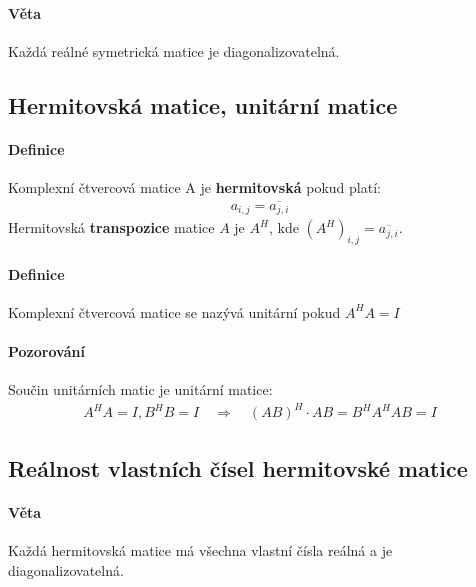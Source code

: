 \documentclass[a4paper,10pt]{article}
\begin{document}
\paragraph{Věta}
Každá reálné symetrická matice je diagonalizovatelná.

\subsection{Hermitovská matice, unitární matice}
\setcounter{equation}{0}
\paragraph{Definice}
Komplexní čtvercová matice A je \textbf{hermitovská} pokud platí:
\begin{align*}
	a_{i,j} = \overline{a_{j,i}}
\end{align*}
Hermitovská \textbf{transpozice} matice $A$ je $A^H$, kde $(A^H)_{i,j} =
\overline{a_{j,i}}$.
\paragraph{Definice}
Komplexní čtvercová matice se nazývá unitární pokud $A^H A = I$
\paragraph{Pozorování}
Součin unitárních matic je unitární matice:
\begin{align*}
	A^H A = I, B^H B = I \quad \Rightarrow \quad (AB)^H \cdot AB = B^H A^H A B =
	I
\end{align*}


\subsection{Reálnost vlastních čísel hermitovské matice}
\setcounter{equation}{0}
\paragraph{Věta}
Každá hermitovská matice má všechna vlastní čísla reálná a je
diagonalizovatelná.
\end{document}
